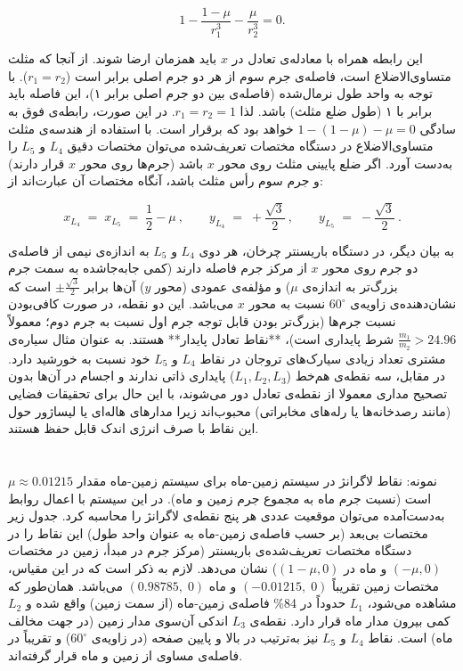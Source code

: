 $$1 - \frac{1-\mu}{r_1^3} - \frac{\mu}{r_2^3} = 0.$$

این رابطه همراه با معادله‌ی تعادل در $x$ باید همزمان ارضا شوند. از آنجا که مثلث متساوی‌الاضلاع است، فاصله‌ی جرم سوم از هر دو جرم اصلی برابر است ($r_1 = r_2$). با توجه به واحد طول نرمال‌شده (فاصله‌ی بین دو جرم اصلی برابر ۱)، این فاصله باید برابر با ۱ (طول ضلع مثلث) باشد. لذا $r_1 = r_2 = 1$. در این صورت، رابطه‌ی فوق به سادگی $1 - (1-\mu) - \mu = 0$ خواهد بود که برقرار است. با استفاده از هندسه‌ی مثلث متساوی‌الاضلاع در دستگاه مختصات تعریف‌شده می‌توان مختصات دقیق $L_4$ و $L_5$ را به‌دست آورد. اگر ضلع پایینی مثلث روی محور $x$ باشد (جرم‌ها روی محور $x$ قرار دارند) و جرم سوم رأس مثلث باشد، آنگاه مختصات آن عبارت‌اند از:

$$ 
x_{L_4} \;=\; x_{L_5} \;=\; \frac{1}{2} - \mu~, \qquad 
y_{L_4} \;=\; +\frac{\sqrt{3}}{2}~, \qquad 
y_{L_5} \;=\; -\frac{\sqrt{3}}{2}~.
$$

به بیان دیگر، در دستگاه باریسنتر چرخان، هر دوی $L_4$ و $L_5$ به اندازه‌ی نیمی از فاصله‌ی دو جرم روی محور $x$ از مرکز جرم فاصله دارند (کمی جابه‌جا‌شده به سمت جرم بزرگ‌تر به اندازه‌ی $\mu$) و مؤلفه‌ی عمودی (محور $y$) آن‌ها برابر $\pm\frac{\sqrt{3}}{2}$ است که نشان‌دهنده‌ی زاویه‌ی $60^\circ$ نسبت به محور $x$ می‌باشد. این دو نقطه، در صورت کافی‌بودن نسبت جرم‌ها (بزرگ‌تر بودن قابل توجه جرم اول نسبت به جرم دوم؛ معمولاً $\frac{m_1}{m_2} > 24.96$ شرط پایداری است)، **نقاط تعادل پایدار** هستند. به عنوان مثال سیاره‌ی مشتری تعداد زیادی سیارک‌های تروجان در نقاط $L_4$ و $L_5$ خود نسبت به خورشید دارد. در مقابل، سه نقطه‌ی هم‌خط ($L_1,L_2,L_3$) پایداری ذاتی ندارند و اجسام در آن‌ها بدون تصحیح مداری معمولا از نقطه‌ی تعادل دور می‌شوند، با این حال برای تحقیقات فضایی (مانند رصدخانه‌ها یا رله‌های مخابراتی) محبوب‌اند زیرا مدارهای هاله‌ای یا لیساژور حول این نقاط با صرف انرژی اندک قابل حفظ هستند.

\section{} نمونه: نقاط لاگرانژ در سیستم زمین-ماه  
برای سیستم زمین-ماه مقدار $\mu \approx 0.01215$ است (نسبت جرم ماه به مجموع جرم زمین و ماه). در این سیستم با اعمال روابط به‌دست‌آمده می‌توان موقعیت عددی هر پنج نقطه‌ی لاگرانژ را محاسبه کرد. جدول زیر مختصات بی‌بعد (بر حسب فاصله‌ی زمین-ماه به عنوان واحد طول) این نقاط را در دستگاه مختصات تعریف‌شده‌ی باریسنتر (مرکز جرم در مبدأ، زمین در مختصات $(-\mu,0)$ و ماه در $(1-\mu,0)$) نشان می‌دهد. لازم به ذکر است که در این مقیاس، مختصات زمین تقریباً $(-0.01215,\;0)$ و ماه $(0.98785,\;0)$ می‌باشد. همان‌طور که مشاهده می‌شود، $L_1$ حدوداً در 84\% فاصله‌ی زمین-ماه (از سمت زمین) واقع شده و $L_2$ کمی بیرون مدار ماه قرار دارد. نقطه‌ی $L_3$ اندکی آن‌سوی مدار زمین (در جهت مخالف ماه) است. نقاط $L_4$ و $L_5$ نیز به‌ترتیب در بالا و پایین صفحه (در زاویه‌ی $60^\circ$) و تقریباً در فاصله‌ی مساوی از زمین و ماه قرار گرفته‌اند.

